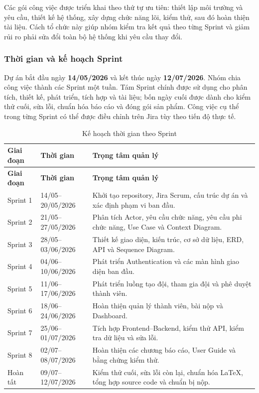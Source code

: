 Các gói công việc được triển khai theo thứ tự ưu tiên: thiết lập môi trường và yêu cầu, thiết kế hệ thống, xây dựng chức năng lõi, kiểm thử, sau đó hoàn thiện tài liệu. Cách tổ chức này giúp nhóm kiểm tra kết quả theo từng Sprint và giảm rủi ro phải sửa đổi toàn bộ hệ thống khi yêu cầu thay đổi.

\subsubsection{Thời gian và kế hoạch Sprint}

Dự án bắt đầu ngày \textbf{14/05/2026} và kết thúc ngày \textbf{12/07/2026}. Nhóm chia công việc thành các Sprint một tuần. Tám Sprint chính được sử dụng cho phân tích, thiết kế, phát triển, tích hợp và tài liệu; bốn ngày cuối được dành cho kiểm thử cuối, sửa lỗi, chuẩn hóa báo cáo và đóng gói sản phẩm. Công việc cụ thể trong từng Sprint có thể được điều chỉnh trên Jira tùy theo tiến độ thực tế.

\begin{longtable}{|p{1.6cm}|p{3.1cm}|p{9.7cm}|}
    \caption{Kế hoạch thời gian theo Sprint}
    \label{tab:sprint-schedule}\\
    \hline
    \textbf{Giai đoạn} & \textbf{Thời gian} & \textbf{Trọng tâm quản lý} \\
    \hline
    \endfirsthead

    \hline
    \textbf{Giai đoạn} & \textbf{Thời gian} & \textbf{Trọng tâm quản lý} \\
    \hline
    \endhead

    Sprint 1 & 14/05--20/05/2026 & Khởi tạo repository, Jira Scrum, cấu trúc dự án và xác định phạm vi ban đầu. \\
    \hline
    Sprint 2 & 21/05--27/05/2026 & Phân tích Actor, yêu cầu chức năng, yêu cầu phi chức năng, Use Case và Context Diagram. \\
    \hline
    Sprint 3 & 28/05--03/06/2026 & Thiết kế giao diện, kiến trúc, cơ sở dữ liệu, ERD, API và Sequence Diagram. \\
    \hline
    Sprint 4 & 04/06--10/06/2026 & Phát triển Authentication và các màn hình giao diện ban đầu. \\
    \hline
    Sprint 5 & 11/06--17/06/2026 & Phát triển luồng tạo đội, tham gia đội và phê duyệt thành viên. \\
    \hline
    Sprint 6 & 18/06--24/06/2026 & Hoàn thiện quản lý thành viên, bài nộp và Dashboard. \\
    \hline
    Sprint 7 & 25/06--01/07/2026 & Tích hợp Frontend--Backend, kiểm thử API, kiểm tra dữ liệu và sửa lỗi. \\
    \hline
    Sprint 8 & 02/07--08/07/2026 & Hoàn thiện các chương báo cáo, User Guide và bằng chứng kiểm thử. \\
    \hline
    Hoàn tất & 09/07--12/07/2026 & Kiểm thử cuối, sửa lỗi còn lại, chuẩn hóa LaTeX, tổng hợp source code và chuẩn bị nộp. \\
    \hline
\end{longtable}

